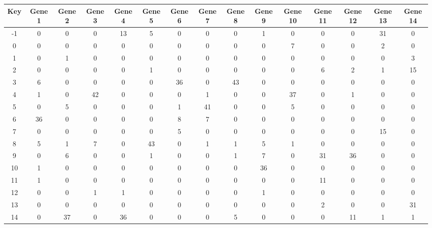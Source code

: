 \begin{tabular}{|c|c|c|c|c|c|c|c|c|c|c|c|c|c|c|}
\hline
Key & Gene 1 & Gene 2 & Gene 3 & Gene 4 & Gene 5 & Gene 6 & Gene 7 & Gene 8 & Gene 9 & Gene 10 & Gene 11 & Gene 12 & Gene 13 & Gene 14 \\
\hline
-1 & 0 & 0 & 0 & 13 & 5 & 0 & 0 & 0 & 1 & 0 & 0 & 0 & 31 & 0 \\
0 & 0 & 0 & 0 & 0 & 0 & 0 & 0 & 0 & 0 & 7 & 0 & 0 & 2 & 0 \\
1 & 0 & 1 & 0 & 0 & 0 & 0 & 0 & 0 & 0 & 0 & 0 & 0 & 0 & 3 \\
2 & 0 & 0 & 0 & 0 & 1 & 0 & 0 & 0 & 0 & 0 & 6 & 2 & 1 & 15 \\
3 & 6 & 0 & 0 & 0 & 0 & 36 & 0 & 43 & 0 & 0 & 0 & 0 & 0 & 0 \\
4 & 1 & 0 & 42 & 0 & 0 & 0 & 1 & 0 & 0 & 37 & 0 & 1 & 0 & 0 \\
5 & 0 & 5 & 0 & 0 & 0 & 1 & 41 & 0 & 0 & 5 & 0 & 0 & 0 & 0 \\
6 & 36 & 0 & 0 & 0 & 0 & 8 & 7 & 0 & 0 & 0 & 0 & 0 & 0 & 0 \\
7 & 0 & 0 & 0 & 0 & 0 & 5 & 0 & 0 & 0 & 0 & 0 & 0 & 15 & 0 \\
8 & 5 & 1 & 7 & 0 & 43 & 0 & 1 & 1 & 5 & 1 & 0 & 0 & 0 & 0 \\
9 & 0 & 6 & 0 & 0 & 1 & 0 & 0 & 1 & 7 & 0 & 31 & 36 & 0 & 0 \\
10 & 1 & 0 & 0 & 0 & 0 & 0 & 0 & 0 & 36 & 0 & 0 & 0 & 0 & 0 \\
11 & 1 & 0 & 0 & 0 & 0 & 0 & 0 & 0 & 0 & 0 & 11 & 0 & 0 & 0 \\
12 & 0 & 0 & 1 & 1 & 0 & 0 & 0 & 0 & 1 & 0 & 0 & 0 & 0 & 0 \\
13 & 0 & 0 & 0 & 0 & 0 & 0 & 0 & 0 & 0 & 0 & 2 & 0 & 0 & 31 \\
14 & 0 & 37 & 0 & 36 & 0 & 0 & 0 & 5 & 0 & 0 & 0 & 11 & 1 & 1 \\
\hline
\end{tabular}